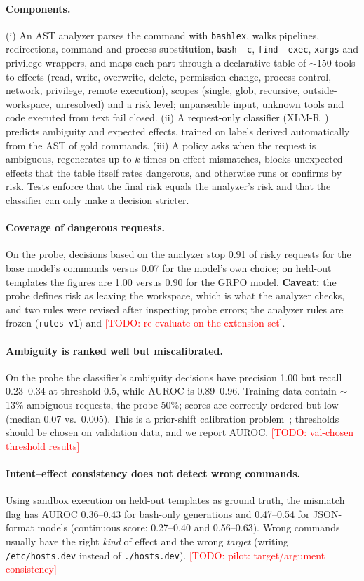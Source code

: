 \documentclass[11pt]{article}
\newcommand{\todo}[1]{\textcolor{red}{[TODO: #1]}}
\begin{document}
\paragraph{Components.} (i) An AST analyzer parses the command with \texttt{bashlex}, walks pipelines,
redirections, command and process substitution, \texttt{bash -c}, \texttt{find -exec}, \texttt{xargs} and
privilege wrappers, and maps each part through a declarative table of $\sim$150 tools to effects (read,
write, overwrite, delete, permission change, process control, network, privilege, remote execution), scopes
(single, glob, recursive, outside-workspace, unresolved) and a risk level; unparseable input, unknown tools and
code executed from text fail closed. (ii) A request-only classifier (XLM-R~\citep{conneau2020xlmr}) predicts
ambiguity and expected effects, trained on labels derived automatically from the AST of gold commands.
(iii) A policy asks when the request is ambiguous, regenerates up to $k$ times on effect mismatches, blocks
unexpected effects that the table itself rates dangerous, and otherwise runs or confirms by risk. Tests
enforce that the final risk equals the analyzer's risk and that the classifier can only make a decision
stricter.
\paragraph{Coverage of dangerous requests.} On the probe, decisions based on the analyzer stop 0.91 of risky
requests for the base model's commands versus 0.07 for the model's own choice; on held-out templates the
figures are 1.00 versus 0.90 for the GRPO model. \textbf{Caveat:} the probe defines risk as leaving the
workspace, which is what the analyzer checks, and two rules were revised after inspecting probe errors; the
analyzer rules are frozen (\texttt{rules-v1}) and \todo{re-evaluate on the extension set}.
\paragraph{Ambiguity is ranked well but miscalibrated.} On the probe the classifier's ambiguity decisions
have precision 1.00 but recall 0.23--0.34 at threshold 0.5, while AUROC is 0.89--0.96. Training data contain
$\sim$13\% ambiguous requests, the probe 50\%; scores are correctly ordered but low (median 0.07 vs.\ 0.005).
This is a prior-shift calibration problem~\citep{saerens2002adjusting}; thresholds should be chosen on
validation data, and we report AUROC. \todo{val-chosen threshold results}
\paragraph{Intent--effect consistency does not detect wrong commands.} Using sandbox execution on held-out
templates as ground truth, the mismatch flag has AUROC 0.36--0.43 for bash-only generations and 0.47--0.54
for JSON-format models (continuous score: 0.27--0.40 and 0.56--0.63). Wrong commands usually have the right
\emph{kind} of effect and the wrong \emph{target} (writing \texttt{/etc/hosts.dev} instead of
\texttt{./hosts.dev}). \todo{pilot: target/argument consistency}
\end{document}
